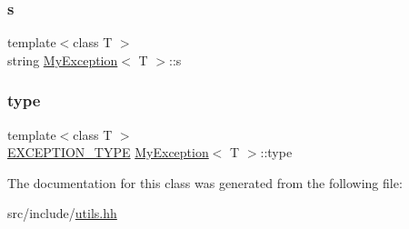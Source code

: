 \mbox{\label{class_my_exception_ac8762871298754f14ce579ee2c928510}} 
\subsubsection{\texorpdfstring{s}{s}}
{\footnotesize\ttfamily template$<$class T $>$ \\
string \mbox{\hyperlink{class_my_exception}{My\+Exception}}$<$ T $>$\+::s}

\mbox{\label{class_my_exception_a6a422c140340e945df9548f548ea0ed8}} 
\subsubsection{\texorpdfstring{type}{type}}
{\footnotesize\ttfamily template$<$class T $>$ \\
\mbox{\hyperlink{utils_8hh_af26a5d951fd6ab4b44e6cd8425aa0383}{E\+X\+C\+E\+P\+T\+I\+O\+N\+\_\+\+T\+Y\+PE}} \mbox{\hyperlink{class_my_exception}{My\+Exception}}$<$ T $>$\+::type}



The documentation for this class was generated from the following file\+:\begin{DoxyCompactItemize}
\item 
src/include/\mbox{\hyperlink{utils_8hh}{utils.\+hh}}\end{DoxyCompactItemize}
